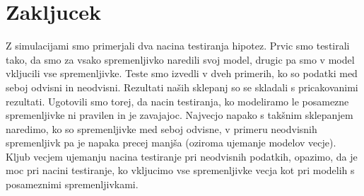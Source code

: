 \documentclass[letterpaper,11pt]{article}
\begin{document}
\section{Zakljucek}
Z simulacijami smo primerjali dva nacina testiranja hipotez. Prvic smo testirali tako, da smo za vsako spremenljivko naredili svoj model, drugic pa smo v model vkljucili vse spremenljivke. Teste smo izvedli v dveh primerih, ko so podatki med seboj odvisni in neodvisni. Rezultati naših sklepanj so se skladali s pricakovanimi rezultati. Ugotovili smo torej, da nacin testiranja, ko modeliramo le posamezne spremenljivke ni pravilen in je zavajajoc. Najvecjo napako s takšnim sklepanjem naredimo, ko so spremenljivke med seboj odvisne, v primeru neodvisnih spremenljivk pa je napaka precej manjša (oziroma ujemanje modelov vecje). Kljub vecjem ujemanju nacina testiranje pri neodvisnih podatkih, opazimo, da je moc pri nacini testiranje, ko vkljucimo vse spremenljivke vecja kot pri modelih s posameznimi spremenljivkami. 
\end{document}
